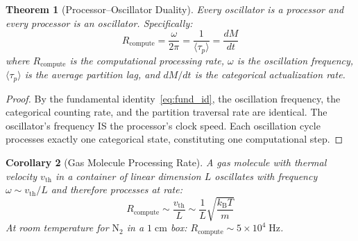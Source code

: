 \documentclass[twocolumn,10pt,a4paper]{article}
\theoremstyle{plain}
\newtheorem{theorem}{Theorem}[section]
\newtheorem{corollary}[theorem]{Corollary}
\theoremstyle{definition}
\theoremstyle{remark}
\newcommand{\kB}{k_{\mathrm{B}}}
\newcommand{\taup}{\tau_p}
\begin{document}
\begin{theorem}[Processor--Oscillator Duality]
\label{thm:proc_osc}
Every oscillator is a processor and every processor is an oscillator. Specifically:
\begin{equation}
    R_{\mathrm{compute}} = \frac{\omega}{2\pi} = \frac{1}{\langle\taup\rangle} = \frac{dM}{dt}
\end{equation}
where $R_{\mathrm{compute}}$ is the computational processing rate, $\omega$ is the oscillation frequency, $\langle\taup\rangle$ is the average partition lag, and $dM/dt$ is the categorical actualization rate.
\end{theorem}

\begin{proof}
By the fundamental identity~\eqref{eq:fund_id}, the oscillation frequency, the categorical counting rate, and the partition traversal rate are identical. The oscillator's frequency IS the processor's clock speed. Each oscillation cycle processes exactly one categorical state, constituting one computational step.
\end{proof}

\begin{corollary}[Gas Molecule Processing Rate]
A gas molecule with thermal velocity $v_{\mathrm{th}}$ in a container of linear dimension $L$ oscillates with frequency $\omega \sim v_{\mathrm{th}}/L$ and therefore processes at rate:
\begin{equation}
    R_{\mathrm{compute}} \sim \frac{v_{\mathrm{th}}}{L} \sim \frac{1}{L}\sqrt{\frac{\kB T}{m}}
\end{equation}
At room temperature for $\mathrm{N}_2$ in a $1\;\mathrm{cm}$ box: $R_{\mathrm{compute}} \sim 5 \times 10^4\;\mathrm{Hz}$.
\end{corollary}
\end{document}
